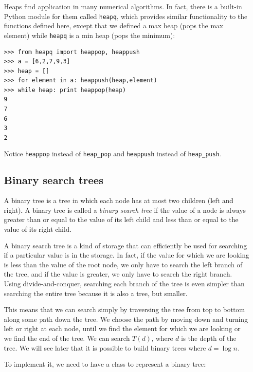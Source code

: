 \documentclass[justified,sixbynine]{tufte-book}
\def\ft{\small\tt}
\theoremstyle{plain}%
\theoremstyle{definition}
\theoremstyle{remark}
\begin{document}
\begin{fullwidth}
Heaps find application in many numerical algorithms. In fact, there is a built-in Python module for them called {\ft heapq}, which provides similar functionality to the functions defined here, except that we defined a max heap (pops the max element) while {\ft heapq} is a min heap (pops the minimum):

\begin{lstlisting}
>>> from heapq import heappop, heappush
>>> a = [6,2,7,9,3]
>>> heap = []
>>> for element in a: heappush(heap,element)
>>> while heap: print heappop(heap)
9
7
6
3
2
\end{lstlisting}

Notice {\ft heappop} instead of {\ft heap\_pop} and {\ft heappush} instead of {\ft heap\_push}.

\subsection{Binary search trees}


A binary tree is a tree in which each node has at most two children (left and right). A binary tree is called a {\it binary search tree} if the value of a node is always greater than or equal to the value of its left child and less than or equal to the value of its right child.

A binary search tree is a kind of storage that can efficiently be used for searching if a particular value is in the storage. In fact, if the value for which we are looking is less than the value of the root node, we only have to search the left branch of the tree, and if the value is greater, we only have to search the right branch. Using divide-and-conquer, searching each branch of the tree is even simpler than searching the entire tree because it is also a tree, but smaller.

This means that we can search simply by traversing the tree from top to bottom along some path down the tree. We choose the path by moving down and turning left or right at each node, until we find the element for which we are looking or we find the end of the tree. We can search $T(d)$, where $d$ is the depth of the tree. We will see later that it is possible to build binary trees where $d=\log n$.

To implement it, we need to have a class to represent a binary tree:


\end{fullwidth}
\end{document}
